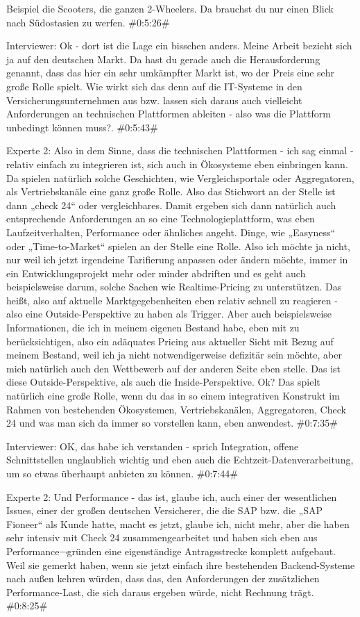 Beispiel die Scooters, die ganzen 2-Wheelers. Da brauchst du nur einen Blick nach Südostasien zu werfen.
\#0:5:26\#

Interviewer:
Ok - dort ist die Lage ein bisschen anders. Meine Arbeit bezieht sich ja auf den deutschen Markt. Da hast du gerade auch die Herausforderung genannt, dass das hier ein sehr umkämpfter Markt ist, wo der Preis eine sehr große Rolle spielt. Wie wirkt sich das denn auf die IT-Systeme in den Versicherungsunternehmen aus bzw. lassen sich daraus auch vielleicht Anforderungen an technischen Plattformen ableiten - also was die Plattform unbedingt können muss?.
\#0:5:43\#

Experte 2:
Also in dem Sinne, dass die technischen Plattformen - ich sag einmal - relativ einfach zu integrieren ist, sich auch in Ökosysteme eben einbringen kann. Da spielen natürlich solche Geschichten, wie Vergleichsportale oder Aggregatoren, als Vertriebskanäle eine ganz große Rolle. Also das Stichwort an der Stelle ist dann „check 24“ oder vergleichbares. Damit ergeben sich dann natürlich auch entsprechende Anforderungen an so eine Technologieplattform, was eben Laufzeitverhalten, Performance oder ähnliches angeht. Dinge, wie „Easyness“ oder „Time-to-Market“ spielen an der Stelle eine Rolle. Also ich möchte ja nicht, nur weil ich jetzt irgendeine Tarifierung anpassen oder ändern möchte, immer in ein Entwicklungsprojekt mehr oder minder abdriften und es geht auch beispielsweise darum, solche Sachen wie Realtime-Pricing zu unterstützen. Das heißt, also auf aktuelle Marktgegebenheiten eben relativ schnell zu reagieren - also eine Outside-Perspektive zu haben als Trigger. Aber auch beispielsweise Informationen, die ich in meinem eigenen Bestand habe, eben mit zu berücksichtigen, also ein adäquates Pricing aus aktueller Sicht mit Bezug auf meinem Bestand, weil ich ja nicht notwendigerweise defizitär sein möchte, aber mich natürlich auch den Wettbewerb auf der anderen Seite eben stelle. Das ist diese Outside-Perspektive, als auch die Inside-Perspektive. Ok? Das spielt natürlich eine große Rolle, wenn du das in so einem integrativen Konstrukt im Rahmen von bestehenden Ökosystemen, Vertriebskanälen, Aggregatoren, Check 24 und was man sich da immer so vorstellen kann, eben anwendest.
\#0:7:35\#

Interviewer:
OK, das habe ich verstanden - sprich Integration, offene Schnittstellen unglaublich wichtig und eben auch die Echtzeit-Datenverarbeitung, um so etwas überhaupt anbieten zu können.
\#0:7:44\#

Experte 2:
Und Performance - das ist, glaube ich, auch einer der wesentlichen Issues, einer der großen deutschen Versicherer, die die SAP bzw. die „SAP Fioneer“ als Kunde hatte, macht es jetzt, glaube ich, nicht mehr, aber die haben sehr intensiv mit Check 24 zusammengearbeitet und haben sich eben aus Performance¬gründen eine eigenständige Antragsstrecke komplett aufgebaut. Weil sie gemerkt haben, wenn sie jetzt einfach ihre bestehenden Backend-Systeme nach außen kehren würden, dass das, den Anforderungen der zusätzlichen Performance-Last, die sich daraus ergeben würde, nicht Rechnung trägt.
\#0:8:25\#

